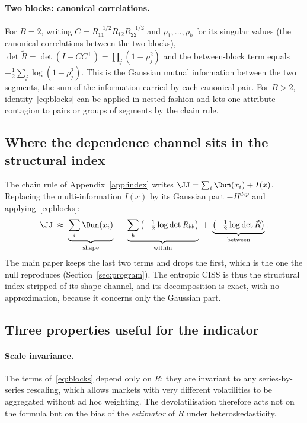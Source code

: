 \paragraph{Two blocks: canonical correlations.} For $B=2$, writing
$C=R_{11}^{-1/2}R_{12}R_{22}^{-1/2}$ and $\rho_1,\dots,\rho_k$ for its singular
values (the canonical correlations between the two blocks),
$\det\tilde R=\det(I-CC^\top)=\prod_j(1-\rho_j^2)$ and the between-block term
equals $-\tfrac12\sum_j\log(1-\rho_j^2)$. This is the Gaussian mutual
information between the two segments, the sum of the information carried by each
canonical pair. For $B>2$, identity~\eqref{eq:blocks} can be applied in nested
fashion and lets one attribute contagion to pairs or groups of segments by the
chain rule.

\subsection{Where the dependence channel sits in the structural index}

The chain rule of Appendix~\ref{app:index} writes $\JJ=\sum_i\Dun(x_i)+I(x)$.
Replacing the multi-information $I(x)$ by its Gaussian part $-H^{dep}$ and
applying~\eqref{eq:blocks}:
\begin{equation}
\label{eq:jblocks}
\JJ\;\approx\;\underbrace{\sum_i\Dun(x_i)}_{\text{shape}}
\;+\;\underbrace{\sum_b\left(-\tfrac12\log\det R_{bb}\right)}_{\text{within}}
\;+\;\underbrace{\left(-\tfrac12\log\det\tilde R\right)}_{\text{between}} .
\end{equation}
The main paper keeps the last two terms and drops the first, which is the one
the null reproduces (Section~\ref{sec:program}). The entropic CISS is thus the
structural index stripped of its shape channel, and its decomposition is exact,
with no approximation, because it concerns only the Gaussian part.

\subsection{Three properties useful for the indicator}

\paragraph{Scale invariance.} The terms of~\eqref{eq:blocks} depend only on
$R$: they are invariant to any series-by-series rescaling, which allows markets
with very different volatilities to be aggregated without ad hoc weighting. The
\citet{forbes2002} devolatilisation therefore acts not on the formula but on the
bias of the \emph{estimator} of $R$ under heteroskedasticity.

